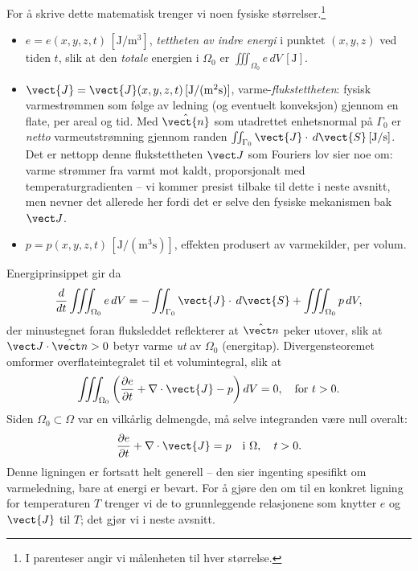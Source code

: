 For å skrive dette matematisk trenger vi noen fysiske størrelser.\footnote{I parenteser angir vi målenheten til hver størrelse.}
\begin{itemize}
\item \( e = e(x,y,z, t) \, [\mathrm{J/m^3}] \), \emph{tettheten av indre energi} i punktet \( (x,y,z) \) ved tiden \( t \), slik at den \emph{totale} energien i \( \Omega_0 \) er \( \iiint_{\Omega_0} e \, dV \, [\mathrm{J}] \).
\item \( \vect{J} = \vect{J}(x,y,z,t) \, [\mathrm{J/(m^2 s)}] \), varme-\emph{flukstettheten}: fysisk varmestrømmen som følge av ledning (og eventuelt konveksjon) gjennom en flate, per areal og tid. Med \( \hat{\vect{n}} \) som utadrettet enhetsnormal på \( \Gamma_0 \) er \emph{netto} varmeutstrømning gjennom randen \( \iint_{\Gamma_0} \vect{J} \cdot \, d\vect{S} \, [\mathrm{J/s}] \). Det er nettopp denne flukstettheten $\vect J$ som Fouriers lov sier noe om: varme strømmer fra varmt mot kaldt, proporsjonalt med temperaturgradienten -- vi kommer presist tilbake til dette i neste avsnitt, men nevner det allerede her fordi det er selve den fysiske mekanismen bak $\vect J$.
\item \( p = p(x,y,z,t) \, [\mathrm{J/(m^3 s)}] \), effekten produsert av varmekilder, per volum.
\end{itemize}
Energiprinsippet gir da
\[
\frac{d}{dt} \iiint_{\Omega_0} e \, dV = - \iint_{\Gamma_0} \vect{J} \cdot \, d\vect{S} + \iiint_{\Omega_0} p \, dV,
\]
der minustegnet foran fluksleddet reflekterer at $\hat{\vect n}$ peker utover, slik at $\vect J\cdot\hat{\vect n}>0$ betyr varme \emph{ut} av $\Omega_0$ (energitap). Divergensteoremet  omformer overflateintegralet til et volumintegral, slik at
\[
\iiint_{\Omega_0} \left( \frac{\partial e}{\partial t} + \nabla \cdot \vect{J} - p \right) dV = 0, \quad \text{for } t > 0.
\]
Siden \( \Omega_0 \subset \Omega \) var en vilkårlig delmengde, må selve integranden være null overalt:
\begin{equation}
\frac{\partial e}{\partial t} + \nabla \cdot \vect{J} = p \quad \text{i } \Omega, \quad t > 0.
\label{eq:energy}
\end{equation}
Denne ligningen er fortsatt helt generell -- den sier ingenting spesifikt om varmeledning, bare at energi er bevart. For å gjøre den om til en konkret ligning for temperaturen \( T \) trenger vi de to grunnleggende relasjonene som knytter \( e \) og \( \vect{J} \) til \( T \); det gjør vi i neste avsnitt.

